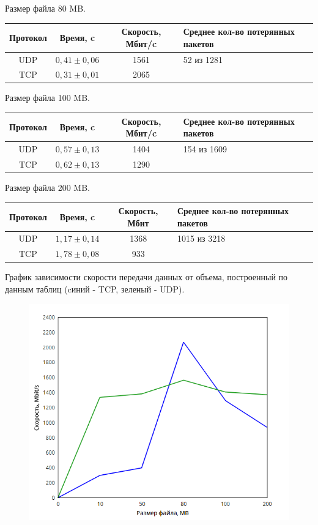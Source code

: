 \documentclass{article}
\begin{document}
Размер файла 80 MB.

\begin{table}[h!]
\begin{tabular}{|c|c|c|p{130pt}|}
\hline
Протокол & Время, c & Скорость, Мбит/c & Среднее кол-во потерянных пакетов \\
\hline
UDP & $0,41 \pm 0,06$ & 1561 & 52 из 1281\\
TCP & $0,31 \pm 0,01$ & 2065 &  \\
\hline
\end{tabular}
\end{table}

Размер файла 100 MB.

\begin{table}[h!]
\begin{tabular}{|c|c|c|p{130pt}|}
\hline
Протокол & Время, c & Скорость, Мбит/c & Среднее кол-во потерянных пакетов \\
\hline
UDP & $0,57 \pm 0,13$ & 1404 & 154 из 1609\\
TCP & $0,62 \pm 0,13$ & 1290 &  \\
\hline
\end{tabular}
\end{table}

Размер файла 200 MB.

\begin{table}[h!]
\begin{tabular}{|c|c|c|p{130pt}|}
\hline
Протокол & Время, c & Скорость, Мбит & Среднее кол-во потерянных пакетов \\
\hline
UDP & $1,17 \pm 0,14$ & 1368 & 1015 из 3218\\
TCP & $1,78 \pm 0,08$ & 933 &  \\
\hline
\end{tabular}
\end{table}

\newpage

График зависимости скорости передачи данных от объема, построенный по данным таблиц (cиний - TCP, зеленый - UDP).

\begin{figure}[h]
\includegraphics[scale=0.5]{6}
\end{figure}
\end{document}
